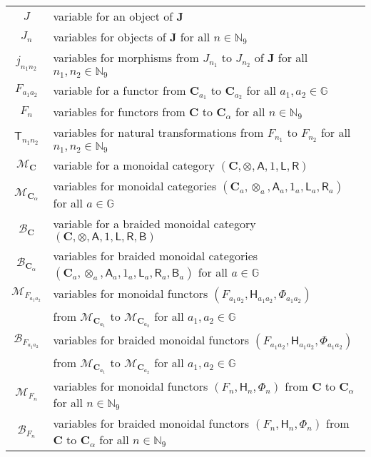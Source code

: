 \begin{longtable}{cl}
  \\[5pt]
  $J$
  &
  variable for an object of $\mathbf{J}$
  \\[5pt]
  $J_{n}$
  &
  variables for objects of $\mathbf{J}$ for all $n \in \mathbb{N}_{9}$
  \\[5pt]
  $j_{n_{1}n_{2}}$
  &
  variables for morphisms from $J_{n_{1}}$ to $J_{n_{2}}$ of
  $\mathbf{J}$ for all $n_{1},n_{2} \in \mathbb{N}_{9}$
  \\[5pt]
  $F_{a_{1}a_{2}}$
  &
  variable for a functor from $\mathbf{C}_{a_{1}}$ to $\mathbf{C}_{a_{2}}$
  for all $a_{1},a_{2} \in \mathbb{G}$
  \\[5pt]
  $F_{n}$
  &
  variables for functors from $\mathbf{C}$ to $\mathbf{C}_{\alpha}$
  for all $n \in \mathbb{N}_{9}$
  \\[5pt]
  $\mathsf{T}_{n_{1}n_{2}}$
  &
  variables for natural transformations from $F_{n_{1}}$ to $F_{n_{2}}$
  for all $n_{1},n_{2} \in \mathbb{N}_{9}$
  \\[5pt]
  $\mathcal{M}_{\mathbf{C}}$
  &
  variable for a monoidal category
  $(\mathbf{C},\otimes,\mathsf{A},1,\mathsf{L},\mathsf{R})$ 
  \\[5pt]
  $\mathcal{M}_{\mathbf{C}_{\alpha}}$
  &
  variables for monoidal categories
  $(\mathbf{C}_{a},\otimes_{a},\mathsf{A}_{a},1_{a},
  \mathsf{L}_{a},\mathsf{R}_{a})$
  for all $a \in \mathbb{G}$
  \\[5pt]
  $\mathcal{B}_{\mathbf{C}}$
  &
  variable for a braided monoidal category
  $(\mathbf{C},\otimes,\mathsf{A},1,\mathsf{L},\mathsf{R},\mathsf{B})$ 
  \\[5pt]
  $\mathcal{B}_{\mathbf{C}_{\alpha}}$
  &
  variables for braided monoidal categories
  $(\mathbf{C}_{a},\otimes_{a},\mathsf{A}_{a},1_{a},
  \mathsf{L}_{a},\mathsf{R}_{a},\mathsf{B}_{a})$
  for all $a \in \mathbb{G}$
  \\[5pt]
  $\mathcal{M}_{F_{a_{1}a_{2}}}$
  &
  variables for monoidal functors
  $(F_{a_{1}a_{2}},\mathsf{H}_{a_{1}a_{2}},\Phi_{a_{1}a_{2}})$
  \\
  $\phantom{\mathcal{M}_{F_{a_{1}a_{2}}}}$
  &
  from $\mathcal{M}_{\mathbf{C}_{a_{1}}}$ to $\mathcal{M}_{\mathbf{C}_{a_{2}}}$
  for all $a_{1},a_{2} \in \mathbb{G}$
  \\[5pt]
  $\mathcal{B}_{F_{a_{1}a_{2}}}$
  &
  variables for braided monoidal functors
  $(F_{a_{1}a_{2}},\mathsf{H}_{a_{1}a_{2}},\Phi_{a_{1}a_{2}})$
  \\
  $\phantom{\mathcal{B}_{F_{a_{1}a_{2}}}}$
  &
  from $\mathcal{M}_{\mathbf{C}_{a_{1}}}$ to $\mathcal{M}_{\mathbf{C}_{a_{2}}}$
  for all $a_{1},a_{2} \in \mathbb{G}$
  \\[5pt]
  $\mathcal{M}_{F_{n}}$
  &
  variables for monoidal functors $(F_{n},\mathsf{H}_{n},\Phi_{n})$
  from $\mathbf{C}$ to $\mathbf{C}_{\alpha}$ for all $n \in \mathbb{N}_{9}$
  \\[5pt]
  $\mathcal{B}_{F_{n}}$
  &
  variables for braided monoidal functors $(F_{n},\mathsf{H}_{n},\Phi_{n})$
  from $\mathbf{C}$ to $\mathbf{C}_{\alpha}$ for all $n \in \mathbb{N}_{9}$
  \\
  \hline
\end{longtable}

